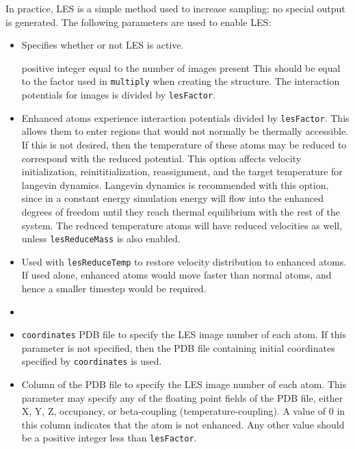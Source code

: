 In practice, LES is a simple method used to increase sampling;
no special output is generated.
The following parameters are used to enable LES:

\begin{itemize}

\item
{}
{Specifies whether or not LES is active.}

{positive integer equal to the number of images present}
{This should be equal to the factor used in {\tt multiply}
 when creating the structure.  The interaction potentials for images is
 divided by {\tt lesFactor}.  
}

\item
{}
{Enhanced atoms experience interaction potentials divided by {\tt lesFactor}.
This allows them to enter regions that would not normally be thermally
accessible.  If this is not desired, then the temperature of these atoms
may be reduced to correspond with the reduced potential.  This option
affects velocity initialization, reinititialization, reassignment, and
the target temperature for langevin dynamics.  Langevin dynamics is
recommended with this option, since in a constant energy simulation energy
will flow into the enhanced degrees of freedom until they reach thermal
equilibrium with the rest of the system.  The reduced temperature atoms
will have reduced velocities as well, unless {\tt lesReduceMass} is also
enabled.}

\item
{}
{Used with {\tt lesReduceTemp} to restore velocity distribution to
enhanced atoms.  If used alone, enhanced atoms would move faster than
normal atoms, and hence a smaller timestep would be required.}

\item
\item
{} {{\tt coordinates}}
{PDB file to specify the LES image number of each atom.
If this parameter is not specified, then 
the PDB file containing initial coordinates specified by 
{\tt coordinates} is used.}

\item
{}
{Column of the PDB file to specify the LES image number of each atom.
This parameter may specify any of the floating point fields of the PDB file, 
either X, Y, Z, occupancy, or beta-coupling (temperature-coupling).  
A value of 0 in this column indicates that the atom is not enhanced.
Any other value should be a positive integer less than {\tt lesFactor}.}

\end{itemize}


